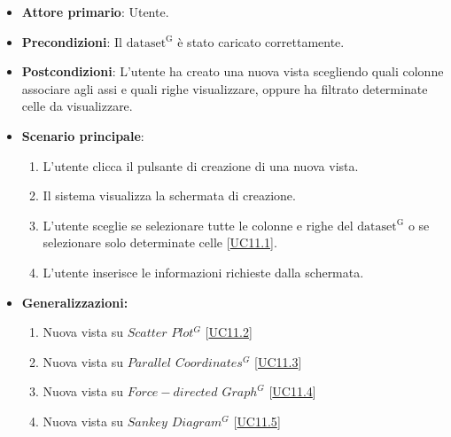 \begin{itemize}
    \item \textbf{Attore primario}: Utente.
    \item \textbf{Precondizioni}: Il ${\mathrm{dataset^{G}}}$ è stato caricato correttamente.
    \item \textbf{Postcondizioni}: L'utente ha creato una nuova vista scegliendo quali colonne associare agli assi e quali righe visualizzare, oppure ha filtrato determinate celle da visualizzare.
    \item \textbf{Scenario principale}:
          \begin{enumerate}
              \item L'utente clicca il pulsante di creazione di una nuova vista.
              \item Il sistema visualizza la schermata di creazione.
              \item L'utente sceglie se selezionare tutte le colonne e righe del ${\mathrm{dataset^{G}}}$ o se selezionare solo determinate celle [\hyperref[sec:UC11.1]{UC11.1}].
              \item L'utente inserisce le informazioni richieste dalla schermata.
          \end{enumerate}
  \item \textbf{Generalizzazioni:} \begin{enumerate}
                                        \item Nuova vista su $Scatter$ $Plot^{G}$ [\hyperref[sec:UC11.2]{UC11.2}]
                                        \item Nuova vista su \textit{$Parallel$ $Coordinates^{G}$} [\hyperref[sec:UC11.3]{UC11.3}]
                                        \item Nuova vista su \textit{$Force-directed$ $Graph^{G}$} [\hyperref[sec:UC11.4]{UC11.4}]
                                        \item Nuova vista su \textit{$Sankey$ $Diagram^{G}$} [\hyperref[sec:UC11.5]{UC11.5}]
                                    \end{enumerate}
\end{itemize}


